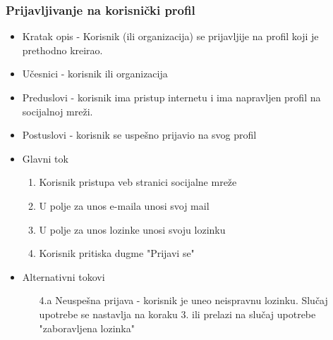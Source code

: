 \subsubsection{Prijavljivanje na korisnički profil}
\begin{itemize}
	\item Kratak opis - Korisnik (ili organizacija) se prijavljije na profil koji je prethodno kreirao.
	\item Učesnici - korisnik ili organizacija
	\item Preduslovi - korisnik ima pristup internetu i ima napravljen profil na socijalnoj mreži.
	\item Postuslovi - korisnik se uspešno prijavio na svog profil
	\item Glavni tok
		\begin{enumerate}
			\item Korisnik pristupa veb stranici socijalne mreže
			\item U polje za unos e-maila unosi svoj mail
			\item U polje za unos lozinke unosi svoju lozinku
			\item Korisnik pritiska dugme "Prijavi se" 
		\end{enumerate}
	\item Alternativni tokovi
	    \begin{itemize}
	        \item[4.a] Neuspešna prijava - korisnik je uneo neispravnu lozinku. Slučaj upotrebe se nastavlja na koraku 3. ili prelazi na slučaj upotrebe "zaboravljena lozinka"
	    \end{itemize}
\end{itemize}
